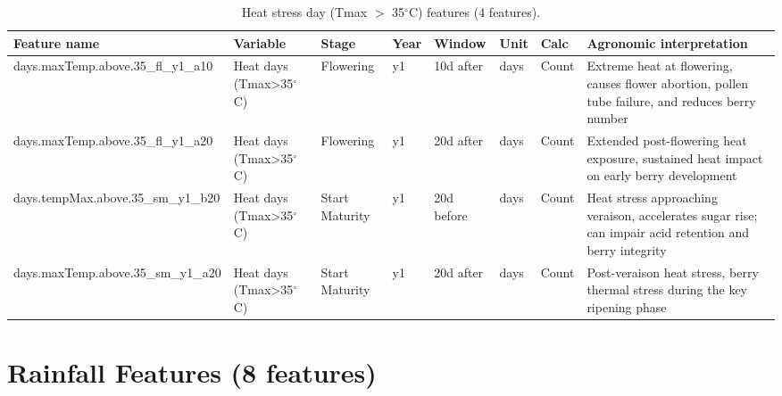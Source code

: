 \begin{table}[htbp]
  \centering
  \caption{Heat stress day (Tmax $>$ 35$^\circ$C) features (4 features).}\label{tab:appc_3}
  \footnotesize
  \setlength{\tabcolsep}{4pt}
  \begin{adjustbox}{max width=\textwidth}
    \begin{tabularx}{\textwidth}{p{4.5cm}|p{1.5cm}|p{1.2cm}|p{0.5cm}|p{1.4cm}|p{0.7cm}|p{0.9cm}|X}
  \toprule
  Feature name & Variable & Stage & Year & Window & Unit & Calc & Agronomic interpretation \\
  \midrule
  days.maxTemp.above.35\_fl\_y1\_a10 & Heat days (Tmax>35$^\circ$C) & Flowering & y1 & 10d after & days & Count & Extreme heat at flowering, causes flower abortion, pollen tube failure, and reduces berry number \\
  days.maxTemp.above.35\_fl\_y1\_a20 & Heat days (Tmax>35$^\circ$C) & Flowering & y1 & 20d after & days & Count & Extended post-flowering heat exposure, sustained heat impact on early berry development \\
  days.tempMax.above.35\_sm\_y1\_b20 & Heat days (Tmax>35$^\circ$C) & Start Maturity & y1 & 20d before & days & Count & Heat stress approaching veraison, accelerates sugar rise; can impair acid retention and berry integrity \\
  days.maxTemp.above.35\_sm\_y1\_a20 & Heat days (Tmax>35$^\circ$C) & Start Maturity & y1 & 20d after & days & Count & Post-veraison heat stress, berry thermal stress during the key ripening phase \\
  \bottomrule
\end{tabularx}
  \end{adjustbox}

\end{table}



\section{Rainfall Features (8 features)}\label{app_sec:rainfall_features_8_features}

